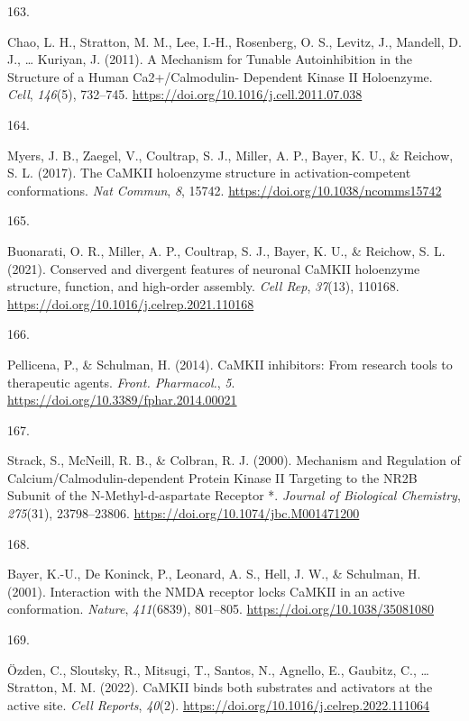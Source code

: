 \documentclass[
  11pt,
  letterpaper,
]{scrreprt}
\newlength{\cslhangindent}
\newlength{\csllabelwidth}
\newenvironment{CSLReferences}[2] %
 {\begin{list}{}{%
  \setlength{\itemindent}{0pt}
  \setlength{\leftmargin}{0pt}
  \setlength{\parsep}{0pt}
  \ifodd #1
   \setlength{\leftmargin}{\cslhangindent}
   \setlength{\itemindent}{-1\cslhangindent}
  \fi
  \setlength{\itemsep}{#2\baselineskip}}}
 {\end{list}}
\newcommand{\CSLLeftMargin}[1]{\parbox[t]{\csllabelwidth}{\strut#1\strut}}
\newcommand{\CSLRightInline}[1]{\parbox[t]{\linewidth - \csllabelwidth}{\strut#1\strut}}
\begin{document}
\begin{CSLReferences}{0}{0}
\CSLLeftMargin{163. }%
\CSLRightInline{Chao, L. H., Stratton, M. M., Lee, I.-H., Rosenberg, O.
S., Levitz, J., Mandell, D. J., \ldots{} Kuriyan, J. (2011). A
{Mechanism} for {Tunable Autoinhibition} in the {Structure} of a {Human
Ca2}+/{Calmodulin- Dependent Kinase II Holoenzyme}. \emph{Cell},
\emph{146}(5), 732--745.
\url{https://doi.org/10.1016/j.cell.2011.07.038}}

\CSLLeftMargin{164. }%
\CSLRightInline{Myers, J. B., Zaegel, V., Coultrap, S. J., Miller, A.
P., Bayer, K. U., \& Reichow, S. L. (2017). The {CaMKII} holoenzyme
structure in activation-competent conformations. \emph{Nat Commun},
\emph{8}, 15742. \url{https://doi.org/10.1038/ncomms15742}}

\CSLLeftMargin{165. }%
\CSLRightInline{Buonarati, O. R., Miller, A. P., Coultrap, S. J., Bayer,
K. U., \& Reichow, S. L. (2021). Conserved and divergent features of
neuronal {CaMKII} holoenzyme structure, function, and high-order
assembly. \emph{Cell Rep}, \emph{37}(13), 110168.
\url{https://doi.org/10.1016/j.celrep.2021.110168}}

\CSLLeftMargin{166. }%
\CSLRightInline{Pellicena, P., \& Schulman, H. (2014). {CaMKII}
inhibitors: From research tools to therapeutic agents. \emph{Front.
Pharmacol.}, \emph{5}. \url{https://doi.org/10.3389/fphar.2014.00021}}

\CSLLeftMargin{167. }%
\CSLRightInline{Strack, S., McNeill, R. B., \& Colbran, R. J. (2000).
Mechanism and {Regulation} of {Calcium}/{Calmodulin-dependent Protein
Kinase II Targeting} to the {NR2B Subunit} of the {N-Methyl-d-aspartate
Receptor} *. \emph{Journal of Biological Chemistry}, \emph{275}(31),
23798--23806. \url{https://doi.org/10.1074/jbc.M001471200}}

\CSLLeftMargin{168. }%
\CSLRightInline{Bayer, K.-U., De Koninck, P., Leonard, A. S., Hell, J.
W., \& Schulman, H. (2001). Interaction with the {NMDA} receptor locks
{CaMKII} in an active conformation. \emph{Nature}, \emph{411}(6839),
801--805. \url{https://doi.org/10.1038/35081080}}

\CSLLeftMargin{169. }%
\CSLRightInline{Özden, C., Sloutsky, R., Mitsugi, T., Santos, N.,
Agnello, E., Gaubitz, C., \ldots{} Stratton, M. M. (2022). {CaMKII}
binds both substrates and activators at the active site. \emph{Cell
Reports}, \emph{40}(2).
\url{https://doi.org/10.1016/j.celrep.2022.111064}}


\end{CSLReferences}
\end{document}
